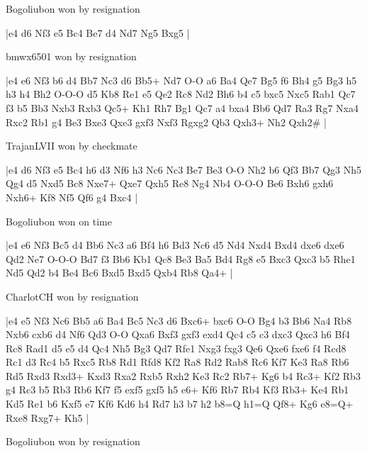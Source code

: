 \showboard

Bogoliubon won by resignation

\makegametitle
|e4 d6 Nf3 e5 Bc4 Be7 d4 Nd7 Ng5 Bxg5  |

\showboard

bmwx6501 won by resignation

\makegametitle
|e4 e6 Nf3 b6 d4 Bb7 Nc3 d6 Bb5+ Nd7 O-O a6 Ba4 Qe7 Bg5 f6 Bh4 g5 Bg3 h5 h3 h4 Bh2 O-O-O d5 Kb8 Re1 e5 Qe2 Rc8 Nd2 Bh6 b4 c5 bxc5 Nxc5 Rab1 Qc7 f3 b5 Bb3 Nxb3 Rxb3 Qc5+ Kh1 Rh7 Bg1 Qc7 a4 bxa4 Bb6 Qd7 Ra3 Rg7 Nxa4 Rxc2 Rb1 g4 Be3 Bxe3 Qxe3 gxf3 Nxf3 Rgxg2 Qb3 Qxh3+ Nh2 Qxh2\#  |

\showboard

TrajanLVII won by checkmate

\makegametitle
|e4 d6 Nf3 e5 Bc4 h6 d3 Nf6 h3 Nc6 Nc3 Be7 Be3 O-O Nh2 b6 Qf3 Bb7 Qg3 Nh5 Qg4 d5 Nxd5 Bc8 Nxe7+ Qxe7 Qxh5 Re8 Ng4 Nb4 O-O-O Be6 Bxh6 gxh6 Nxh6+ Kf8 Nf5 Qf6 g4 Bxc4  |

\showboard

Bogoliubon won on time

\makegametitle
|e4 e6 Nf3 Bc5 d4 Bb6 Nc3 a6 Bf4 h6 Bd3 Nc6 d5 Nd4 Nxd4 Bxd4 dxe6 dxe6 Qd2 Ne7 O-O-O Bd7 f3 Bb6 Kb1 Qc8 Be3 Ba5 Bd4 Rg8 e5 Bxc3 Qxc3 b5 Rhe1 Nd5 Qd2 b4 Be4 Bc6 Bxd5 Bxd5 Qxb4 Rb8 Qa4+  |

\showboard

CharlotCH won by resignation

\makegametitle
|e4 e5 Nf3 Nc6 Bb5 a6 Ba4 Bc5 Nc3 d6 Bxc6+ bxc6 O-O Bg4 b3 Bb6 Na4 Rb8 Nxb6 cxb6 d4 Nf6 Qd3 O-O Qxa6 Bxf3 gxf3 exd4 Qc4 c5 c3 dxc3 Qxc3 h6 Bf4 Rc8 Rad1 d5 e5 d4 Qc4 Nh5 Bg3 Qd7 Rfe1 Nxg3 fxg3 Qe6 Qxe6 fxe6 f4 Rcd8 Rc1 d3 Rc4 b5 Rxc5 Rb8 Rd1 Rfd8 Kf2 Ra8 Rd2 Rab8 Rc6 Kf7 Ke3 Ra8 Rb6 Rd5 Rxd3 Rxd3+ Kxd3 Rxa2 Rxb5 Rxh2 Ke3 Rc2 Rb7+ Kg6 b4 Rc3+ Kf2 Rb3 g4 Rc3 b5 Rb3 Rb6 Kf7 f5 exf5 gxf5 h5 e6+ Kf6 Rb7 Rb4 Kf3 Rb3+ Ke4 Rb1 Kd5 Re1 b6 Kxf5 e7 Kf6 Kd6 h4 Rd7 h3 b7 h2 b8=Q h1=Q Qf8+ Kg6 e8=Q+ Rxe8 Rxg7+ Kh5  |

\showboard

Bogoliubon won by resignation

